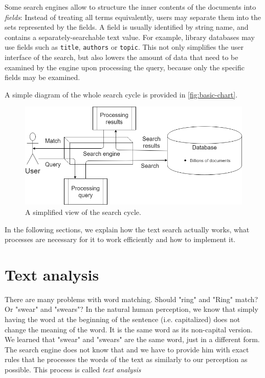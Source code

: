 Some search engines allow to structure the inner contents of the documents into \emph{fields}: Instead of treating all terms equivalently, users may separate them into the sets represented by the fields. A field is usually identified by string name, and contains a separately-searchable text value. For example, library databases may use fields such as \texttt{title}, \texttt{authors} or \texttt{topic}. This not only simplifies the user interface of the search, but also lowers the amount of data that need to be examined by the engine upon processing the query, because only the specific fields may be examined.

A simple diagram of the whole search cycle is provided in \autoref{fig:basic-chart}.
\begin{figure}
\centering
\includegraphics[width=\textwidth]{img/basic_chart.png}
\caption{A simplified view of the search cycle.}
\label{fig:basic-chart}
\end{figure}

In the following sections, we explain how the text search actually works, what processes are necessary for it to work efficiently and how to implement it.


\section{Text analysis}
\label{analysis}
There are many problems with word matching. Should  "ring" and  "Ring" match? Or  "swear" and  "swears"? In the natural human perception, we know that simply having the word at the beginning of the sentence (i.e. capitalized) does not change the meaning of the word. It is the same word as its non-capital version. We learned that "swear" and  "swears" are the same word, just in a different form. The search engine does not know that and we have to provide him with exact rules that he processes the words of the text as similarly to our perception as possible. This process is called \emph{text analysis}

